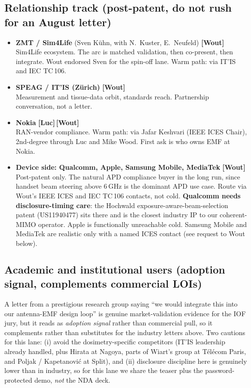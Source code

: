 \documentclass[11pt,a4paper]{article}
\newcommand{\owner}[1]{\textbf{[#1]}}
\begin{document}
\subsection*{Relationship track (post-patent, do not rush for an August letter)}
\begin{itemize}[itemsep=0.7em, leftmargin=1.4em]
  \item \textbf{ZMT / Sim4Life} (Sven K\"uhn, with N.\ Kuster, E.\ Neufeld) \quad \owner{Wout}\\
  Sim4Life ecosystem. The arc is matched validation, then co-present, then integrate. Wout endorsed Sven for the spin-off lane. Warm path: via IT'IS and IEC TC\,106.

  \item \textbf{SPEAG / IT'IS (Z\"urich)} \quad \owner{Wout}\\
  Measurement and tissue-data orbit, standards reach. Partnership conversation, not a letter.

  \item \textbf{Nokia} \quad \owner{Luc}\,\owner{Wout}\\
  RAN-vendor compliance. Warm path: via Jafar Keshvari (IEEE ICES Chair), 2nd-degree through Luc and Mike Wood. First ask is who owns EMF at Nokia.

  \item \textbf{Device side: Qualcomm, Apple, Samsung Mobile, MediaTek} \quad \owner{Wout}\\
  Post-patent only. The natural APD compliance buyer in the long run, since handset beam steering above 6\,GHz is the dominant APD use case. Route via Wout's IEEE ICES and IEC TC\,106 contacts, not cold. \textbf{Qualcomm needs disclosure-timing care}: the Hochwald exposure-aware-beam-selection patent (US11940477) sits there and is the closest industry IP to our coherent-MIMO operator. Apple is functionally unreachable cold. Samsung Mobile and MediaTek are realistic only with a named ICES contact (see request to Wout below).
\end{itemize}

\subsection*{Academic and institutional users (adoption signal, complements commercial LOIs)}
A letter from a prestigious research group saying ``we would integrate this into our antenna-EMF design loop''
is genuine market-validation evidence for the IOF jury, but it reads as \emph{adoption signal} rather than
commercial pull, so it complements rather than substitutes for the industry letters above. Two cautions for
this lane: (i) avoid the dosimetry-specific competitors (IT'IS leadership already handled, plus Hirata at
Nagoya, parts of Wiart's group at T\'el\'ecom Paris, and Poljak / Kapetanovi\'c at Split), and (ii)
disclosure discipline here is genuinely lower than in industry, so for this lane we share the teaser plus
the password-protected demo, \emph{not} the NDA deck.
\end{document}
